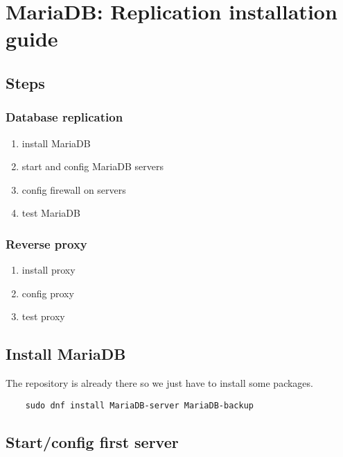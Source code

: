 
\section{MariaDB: Replication installation guide}
\label{sec: replication-installation-guide}

\subsection{Steps}

\subsubsection{Database replication}

\begin{enumerate}
    \item install MariaDB
    \item start and config MariaDB servers
    \item config firewall on servers
    \item test MariaDB
\end{enumerate}

\subsubsection{Reverse proxy}

\begin{enumerate}
    \item install proxy
    \item config proxy
    \item test proxy
\end{enumerate}

\subsection{Install MariaDB}

The repository is already there so we just have to install some packages.

\begin{lstlisting}
    sudo dnf install MariaDB-server MariaDB-backup
\end{lstlisting}

\subsection{Start/config first server}

